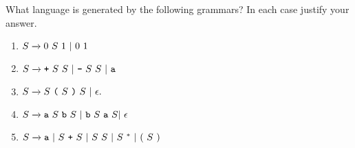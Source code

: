 \begin{exercise}\label{ex:020202}
    What language is generated by the following grammars? In each case justify 
    your answer.
    \begin{enumerate}[label=\alph*)]
        \item $S \yld 0\ S\ 1\ |\ 0\ 1$
        \item $S \yld \texttt{+}\ S\ S\ |\ \texttt{-}\ S\ S\ |\ \texttt{a}$
        \item $S \yld S\ \texttt{(}\ S\ \texttt{)}\ S\ |\ \epsilon.$
        \item $S \yld \texttt{a}\ S\ \texttt{b}\ S\ |\ \texttt{b}\ S\ \texttt{a}\ S |\ \epsilon$
        \item $S \yld \texttt{a}\ |\ S\ \texttt{+}\ S\ |\ S\ S\ |\ S^{\ *}\ |\ (\ S\ )$
    \end{enumerate}
\end{exercise}
